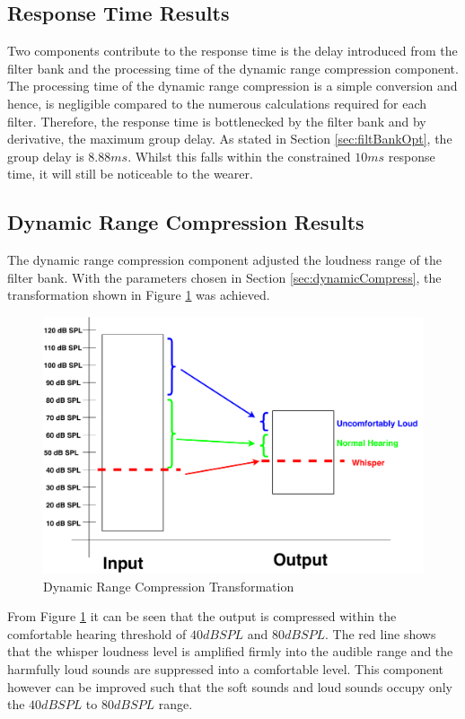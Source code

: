 \documentclass[11pt,onecolumn]{witseiepaper}
\begin{document}
\subsection{Response Time Results}
\label{sec:resGroupDelay}

\noindent Two components contribute to the response time is the delay introduced from the filter bank and the processing time of the dynamic range compression component. The processing time of the dynamic range compression is a simple conversion and hence, is negligible compared to the numerous calculations required for each filter. Therefore, the response time is bottlenecked by the filter bank and by derivative, the maximum group delay. As stated in Section \ref{sec:filtBankOpt}, the group delay is $8.88ms$. Whilst this falls within the constrained $10ms$ response time, it will still be noticeable to the wearer. 


\subsection{Dynamic Range Compression Results}
\label{sec:resCompress}

\noindent The dynamic range compression component adjusted the loudness range of the filter bank. With the parameters chosen in Section \ref{sec:dynamicCompress}, the transformation shown in Figure \ref{fig:loudTrans} was achieved.

\begin{figure}[h]
\centering
\includegraphics[width=0.65\linewidth]{loudTrans.pdf}
\caption{Dynamic Range Compression Transformation}
\label{fig:loudTrans}
\end{figure} 

\noindent From Figure \ref{fig:loudTrans} it can be seen that the output is compressed within the comfortable hearing threshold of $40dBSPL$ and $80dBSPL$. The red line shows that the whisper loudness level is amplified firmly into the audible range and the harmfully loud sounds are suppressed into a comfortable level. This component however can be improved such that the soft sounds and loud sounds occupy only the $40dBSPL$ to $80dBSPL$ range.
\end{document}
